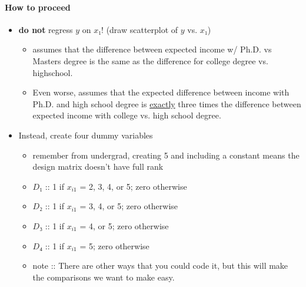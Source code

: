 \paragraph{How to proceed}
\begin{itemize}
\item \textbf{do not} regress $y$ on $x₁$! (draw scatterplot of $y$ vs. $x₁$)
\begin{itemize}
\item assumes that the difference between expected income w/
          Ph.D. vs Masters degree is the same as the difference for
          college degree vs. highschool.
\item Even worse, assumes that the expected difference between
          income with Ph.D. and high school degree is \underline{exactly} three
          times the difference between expected income with college
          vs. high school degree.
\end{itemize}
\item Instead, create four dummy variables
\begin{itemize}
\item remember from undergrad, creating 5 and including a constant
          means the design matrix doesn't have full rank
\item $D₁$ :: 1 if $x_{i1}$ = 2, 3, 4, or 5; zero otherwise
\item $D₂$ :: 1 if $x_{i1}$ = 3, 4, or 5; zero otherwise
\item $D₃$ :: 1 if $x_{i1}$ = 4, or 5; zero otherwise
\item $D₄$ :: 1 if $x_{i1}$ = 5; zero otherwise
\item note :: There are other ways that you could code it, but
                  this will make the comparisons we want to make easy.
\end{itemize}
\end{itemize}

